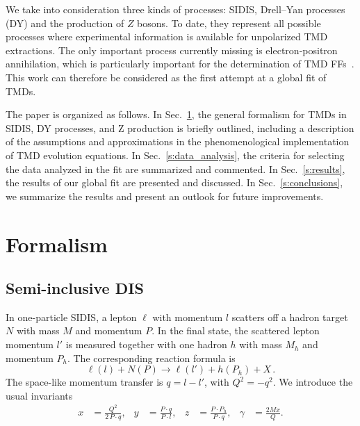 \documentclass[aps,preprintnumbers,showpacs,nofootinbib,superscriptaddress,floatfix]{revtex4}
\begin{document}
We take into consideration three kinds of processes: SIDIS, 
Drell--Yan processes (DY) and the production of $Z$
bosons. To date, they represent 
all possible processes
  where experimental information is available for unpolarized TMD
  extractions. 
The only important
process currently missing is electron-positron annihilation, which is
particularly important for the determination of TMD
FFs~\cite{Bacchetta:2015ora}. This work can therefore be considered as the
first attempt at a global fit of TMDs.  

The paper is organized as follows. In Sec.~\ref{s:theory}, the general
formalism for TMDs in SIDIS, DY processes, and Z production is briefly outlined, including a
description of the assumptions and approximations in the phenomenological
implementation of TMD evolution equations. In Sec.~\ref{s:data_analysis}, the criteria
for selecting the data analyzed in the fit are summarized and commented. In
Sec.~\ref{s:results}, the results of our global fit are presented and
discussed. In Sec.~\ref{s:conclusions}, we summarize the results and present an outlook for future improvements. 
   

\section{Formalism}
\label{s:theory}


\subsection{Semi-inclusive DIS}
\label{ss:SIDIS_formalism}

In one-particle SIDIS, a lepton $\ell$ with momentum $l$ scatters 
off a hadron target $N$ with mass $M$ and momentum
$P$. In the final state, the scattered lepton momentum 
$l'$ is measured together with
one hadron $h$ with mass $M_h$
and momentum $P_h$. The corresponding reaction formula is  
\begin{equation}
  \label{e:sidis}
\ell(l) + N(P) \to \ell(l') + h(P_h) + X \, .
\end{equation}
The space-like momentum transfer is $q = l - l'$, with $Q^2 = - q^2$. We
introduce the usual invariants  
\begin{align}
  \label{e:xyz}
x &= \frac{Q^2}{2\,P\cdot q},
&
y &= \frac{P \cdot q}{P \cdot l},
&
z &= \frac{P \cdot P_h}{P\cdot q},
&
\gamma &= \frac{2 M x}{Q} .
\end{align}
\end{document}
